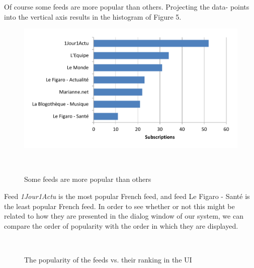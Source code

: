 Of course some feeds are more popular than others. Projecting the data- points into the vertical axis results in the histogram of Figure 5.

\begin{figure}[h!]
\centering
  \includegraphics[width=\columnwidth]{figures/feed_popularity}
  \caption{Some feeds are more popular than others}~\label{fig:registrations}
\end{figure}


Feed {\em 1Jour1Actu} is the most popular French feed, and feed Le Figaro - Sant\'e is the least popular French feed. In order to see whether or not this might be related to how they are presented in the dialog window of our system, we can compare the order of popularity with the order in which they are displayed.

\begin{figure}[h!]
\centering
  \caption{The popularity of the feeds vs. their ranking in the UI}~\label{fig:registrations}
\end{figure}


